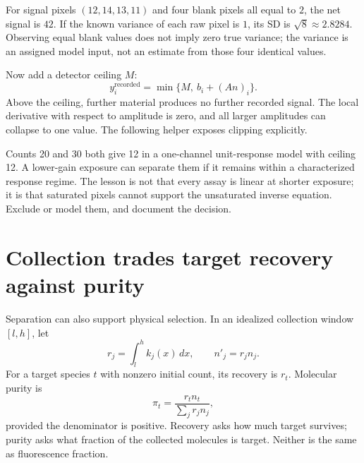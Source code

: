 For signal pixels $(12,14,13,11)$ and four blank pixels all equal to $2$, the net signal is $42$. If the known variance of each raw pixel is $1$, its SD is $\sqrt8\approx2.8284$. Observing equal blank values does not imply zero true variance; the variance is an assigned model input, not an estimate from those four identical values.

Now add a detector ceiling $M$:
\begin{equation}
y_i^{\mathrm{recorded}}=\min\{M,\ b_i+(An)_i\}.
\end{equation}
Above the ceiling, further material produces no further recorded signal. The local derivative with respect to amplitude is zero, and all larger amplitudes can collapse to one value. The following helper exposes clipping explicitly.

Counts 20 and 30 both give 12 in a one-channel unit-response model with ceiling 12. A lower-gain exposure can separate them if it remains within a characterized response regime. The lesson is not that every assay is linear at shorter exposure; it is that saturated pixels cannot support the unsaturated inverse equation. Exclude or model them, and document the decision.

\section{Collection trades target recovery against purity}
Separation can also support physical selection. In an idealized collection window $[l,h]$, let
\begin{equation}
r_j=\int_l^h k_j(x)\,dx,\qquad n'_j=r_jn_j.
\end{equation}
For a target species $t$ with nonzero initial count, its recovery is $r_t$. Molecular purity is
\begin{equation}
\pi_t=\frac{r_tn_t}{\sum_j r_jn_j},
\end{equation}
provided the denominator is positive. Recovery asks how much target survives; purity asks what fraction of the collected molecules is target. Neither is the same as fluorescence fraction.

\begin{center}\end{center}

